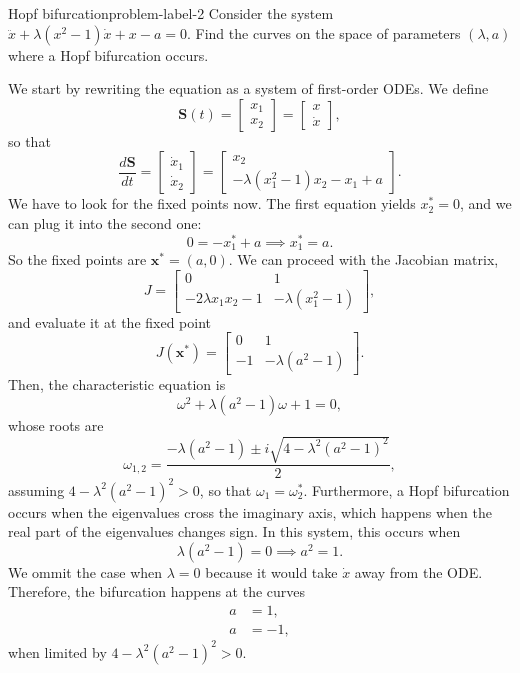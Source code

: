 \begin{problem}{Hopf bifurcation}{problem-label-2}
Consider the system $\ddot{x} + \lambda(x^2 - 1)\dot{x} + x - a = 0$.
Find the curves on the space of parameters $(\lambda, a)$ where a Hopf bifurcation occurs.
\end{problem}

We start by rewriting the equation as a system of first-order ODEs. We define
\[
    \textbf{S}(t) = \begin{bmatrix}
        x_1\\
        x_2
    \end{bmatrix} = \begin{bmatrix}
        x\\
        \dot{x}
    \end{bmatrix},
\]
so that
\[
    \frac{d\textbf{S}}{dt} = \begin{bmatrix}
        \dot{x}_1\\
        \dot{x}_2
    \end{bmatrix}=\begin{bmatrix}
        x_2\\
        -\lambda(x_1^2 - 1)x_2 - x_1 + a
    \end{bmatrix}.
\]
We have to look for the fixed points now. The first equation yields $x_2^*=0$, and
we can plug it into the second one:
\[
    0 = - x_1^* + a \implies x_1^* = a.
\]
So the fixed points are $\textbf{x}^*=(a,0)$. We can proceed with the Jacobian matrix,
\[
    J = \begin{bmatrix}
        0 & 1\\
        -2\lambda x_1 x_2 - 1 & -\lambda(x_1^2 - 1)
    \end{bmatrix},
\]
and evaluate it at the fixed point
\[
    J(\textbf{x}^*) = \begin{bmatrix}
        0 & 1\\
        -1 & -\lambda(a^2 - 1)
    \end{bmatrix}.
\]
Then, the characteristic equation is
\[
    \omega^2 + \lambda(a^2 - 1)\omega + 1 = 0,
\]
whose roots are
\[
    \omega_{1,2} = \frac{-\lambda(a^2 - 1) \pm i\sqrt{4-\lambda^2(a^2 - 1)^2}}{2},
\]
assuming $4-\lambda^2(a^2 - 1)^2>0$, so that $\omega_1=\omega_2^*$. Furthermore, a Hopf bifurcation occurs
when the eigenvalues cross the imaginary axis, which happens when the real part of the eigenvalues changes
sign. In this system, this occurs when
\[
    \lambda(a^2 - 1) = 0 \implies a^2 = 1.
\]
We ommit the case when $\lambda = 0$ because it would take $\dot{x}$ away from the ODE. Therefore, the bifurcation
happens at the curves
\[
\boxed{
    \begin{aligned}
        a &= 1,\\
        a &= -1,
    \end{aligned}
}
\]
when limited by $4-\lambda^2(a^2 - 1)^2>0$.

